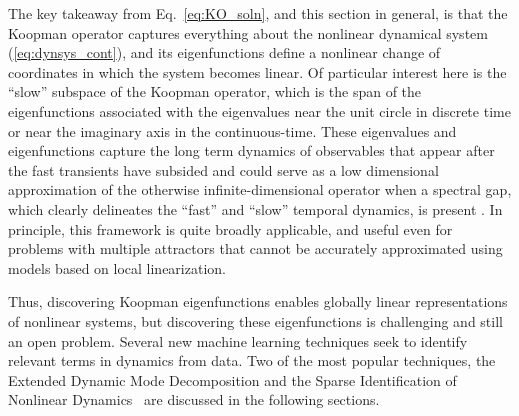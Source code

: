 \par
The key takeaway from Eq.~\ref{eq:KO_soln}, and this section in general,
is that the Koopman operator captures everything about the nonlinear dynamical system (\ref{eq:dynsys_cont}), and its eigenfunctions define a nonlinear change of coordinates in which the system becomes linear. Of particular interest here is the ``slow'' subspace of the Koopman operator, which is the span of the eigenfunctions associated with the eigenvalues near the unit circle in discrete time or near the imaginary axis in the continuous-time. These eigenvalues and eigenfunctions capture the long term dynamics of observables that appear after the fast transients have subsided and could serve as a low dimensional approximation of the otherwise infinite-dimensional operator when a spectral gap, which clearly delineates the ``fast'' and ``slow'' temporal dynamics, is present \cite{WILLIAMS2016704}.
In principle, this framework is quite broadly applicable, and useful even for problems with multiple attractors that cannot be accurately approximated using models based on local linearization.\par
Thus, discovering Koopman eigenfunctions enables globally linear representations of nonlinear systems, but discovering these eigenfunctions is challenging and still an open problem. Several new machine learning techniques seek to identify relevant terms in dynamics from data. Two of the most popular techniques, the Extended Dynamic Mode Decomposition and the Sparse Identification of Nonlinear Dynamics~\cite{SINDy} are discussed in the following sections.
\newpage
